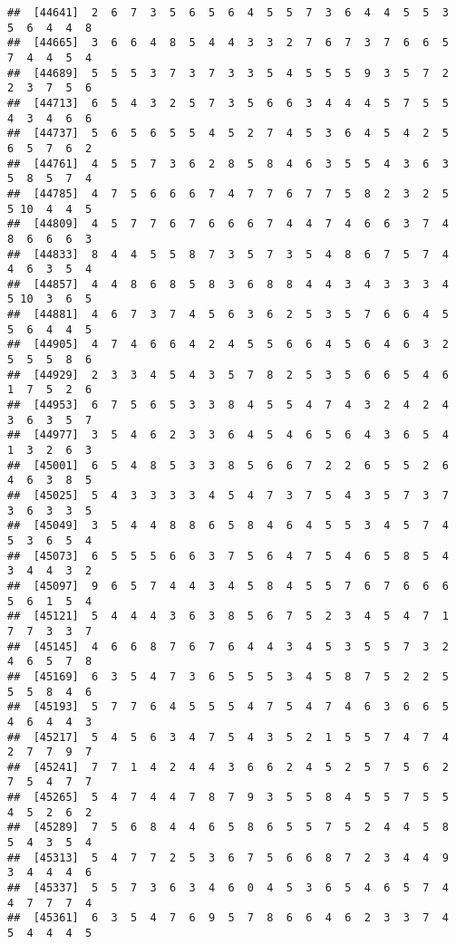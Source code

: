 \documentclass[
]{book}
\begin{document}
\begin{verbatim}
##  [44641]  2  6  7  3  5  6  5  6  4  5  5  7  3  6  4  4  5  5  3  5  6  4  4  8
##  [44665]  3  6  6  4  8  5  4  4  3  3  2  7  6  7  3  7  6  6  5  7  4  4  5  4
##  [44689]  5  5  5  3  7  3  7  3  3  5  4  5  5  5  9  3  5  7  2  2  3  7  5  6
##  [44713]  6  5  4  3  2  5  7  3  5  6  6  3  4  4  4  5  7  5  5  4  3  4  6  6
##  [44737]  5  6  5  6  5  5  4  5  2  7  4  5  3  6  4  5  4  2  5  6  5  7  6  2
##  [44761]  4  5  5  7  3  6  2  8  5  8  4  6  3  5  5  4  3  6  3  5  8  5  7  4
##  [44785]  4  7  5  6  6  6  7  4  7  7  6  7  7  5  8  2  3  2  5  5 10  4  4  5
##  [44809]  4  5  7  7  6  7  6  6  6  7  4  4  7  4  6  6  3  7  4  8  6  6  6  3
##  [44833]  8  4  4  5  5  8  7  3  5  7  3  5  4  8  6  7  5  7  4  4  6  3  5  4
##  [44857]  4  4  8  6  8  5  8  3  6  8  8  4  4  3  4  3  3  3  4  5 10  3  6  5
##  [44881]  4  6  7  3  7  4  5  6  3  6  2  5  3  5  7  6  6  4  5  5  6  4  4  5
##  [44905]  4  7  4  6  6  4  2  4  5  5  6  6  4  5  6  4  6  3  2  5  5  5  8  6
##  [44929]  2  3  3  4  5  4  3  5  7  8  2  5  3  5  6  6  5  4  6  1  7  5  2  6
##  [44953]  6  7  5  6  5  3  3  8  4  5  5  4  7  4  3  2  4  2  4  3  6  3  5  7
##  [44977]  3  5  4  6  2  3  3  6  4  5  4  6  5  6  4  3  6  5  4  1  3  2  6  3
##  [45001]  6  5  4  8  5  3  3  8  5  6  6  7  2  2  6  5  5  2  6  4  6  3  8  5
##  [45025]  5  4  3  3  3  3  4  5  4  7  3  7  5  4  3  5  7  3  7  3  6  3  3  5
##  [45049]  3  5  4  4  8  8  6  5  8  4  6  4  5  5  3  4  5  7  4  5  3  6  5  4
##  [45073]  6  5  5  5  6  6  3  7  5  6  4  7  5  4  6  5  8  5  4  3  4  4  3  2
##  [45097]  9  6  5  7  4  4  3  4  5  8  4  5  5  7  6  7  6  6  6  5  6  1  5  4
##  [45121]  5  4  4  4  3  6  3  8  5  6  7  5  2  3  4  5  4  7  1  7  7  3  3  7
##  [45145]  4  6  6  8  7  6  7  6  4  4  3  4  5  3  5  5  7  3  2  4  6  5  7  8
##  [45169]  6  3  5  4  7  3  6  5  5  5  3  4  5  8  7  5  2  2  5  5  5  8  4  6
##  [45193]  5  7  7  6  4  5  5  5  4  7  5  4  7  4  6  3  6  6  5  4  6  4  4  3
##  [45217]  5  4  5  6  3  4  7  5  4  3  5  2  1  5  5  7  4  7  4  2  7  7  9  7
##  [45241]  7  7  1  4  2  4  4  3  6  6  2  4  5  2  5  7  5  6  2  7  5  4  7  7
##  [45265]  5  4  7  4  4  7  8  7  9  3  5  5  8  4  5  5  7  5  5  4  5  2  6  2
##  [45289]  7  5  6  8  4  4  6  5  8  6  5  5  7  5  2  4  4  5  8  5  4  3  5  4
##  [45313]  5  4  7  7  2  5  3  6  7  5  6  6  8  7  2  3  4  4  9  3  4  4  4  6
##  [45337]  5  5  7  3  6  3  4  6  0  4  5  3  6  5  4  6  5  7  4  4  7  7  7  4
##  [45361]  6  3  5  4  7  6  9  5  7  8  6  6  4  6  2  3  3  7  4  5  4  4  4  5

\end{verbatim}
\end{document}
